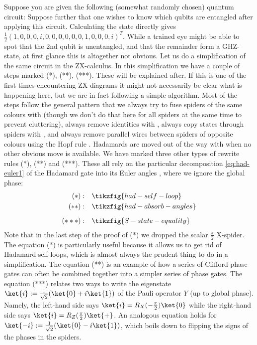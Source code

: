 \documentclass[a4paper,onecolumn,superscriptaddress,11pt,%
				unpublished,%
				allowfontchageintitle,%
				]{quantumarticle}
\begin{document}
Suppose you are given the following (somewhat randomly chosen) quantum circuit:
Suppose further that one wishes to know which qubits are entangled after applying this circuit. 
Calculating the state directly gives $\frac12(1,0,0,0,i,0,0,0,0,0,0,1,0,0,0,i)^T$. While a trained eye might be able to spot that the 2nd qubit is unentangled, and that the remainder form a GHZ-state, at first glance this is altogether not obvious. Let us do a simplification of the same circuit in the ZX-calculus.
In this simplification we have a couple of steps marked (*), (**), (***). These will be explained after.
If this is one of the first times encountering ZX-diagrams it might not necessarily be clear what is happening here, but we are in fact following a simple algorithm. 
Most of the steps follow the general pattern that we always try to fuse spiders of the same colours with \SpiderRule (though we don't do that here for all spiders at the same time to prevent cluttering), always remove identities with \IdRule, always copy states through spiders with \CopyRule, and always remove parallel wires between spiders of opposite colours using the Hopf rule \HopfRule. Hadamards are moved out of the way with \HadamardRule when no other obvious move is available.
We have marked three other types of rewrite rules (*), (**) and (***). These all rely on the particular decomposition \eqref{eq:had-euler1} of the Hadamard gate into its Euler angles , where we ignore the global phase:
\begingroup
\allowdisplaybreaks
\begin{align}
	(*):&\quad \tikzfig{had-self-loop} \label{eq:had-self-loop-removal}\\
	(**):&\quad \tikzfig{had-absorb-angles}\\[0.2cm]
	(***):&\quad \tikzfig{S-state-equality}\label{eq:s-state-equality}
\end{align}
\endgroup
Note that in the last step of the proof of (*) we dropped the scalar $\frac\pi2$ X-spider. The equation (*) is particularly useful because it allows us to get rid of Hadamard self-loops, which is almost always the prudent thing to do in a simplification. 
The equation (**) is an example of how a series of Clifford phase gates can often be combined together into a simpler series of phase gates.
The equation (***) relates two ways to write the eigenstate $\ket{i}:=\frac{1}{\sqrt{2}}(\ket{0}+i\ket{1})$ of the Pauli operator $Y$ (up to global phase). Namely, the left-hand side says $\ket{i} = R_X(-\frac\pi2)\ket{0}$ while the right-hand side says $\ket{i} = R_Z(\frac\pi2)\ket{+}$. An analogous equation holds for $\ket{-i}:= \frac{1}{\sqrt{2}}(\ket{0}-i\ket{1})$, which boils down to flipping the signs of the phases in the spiders.
\end{document}
